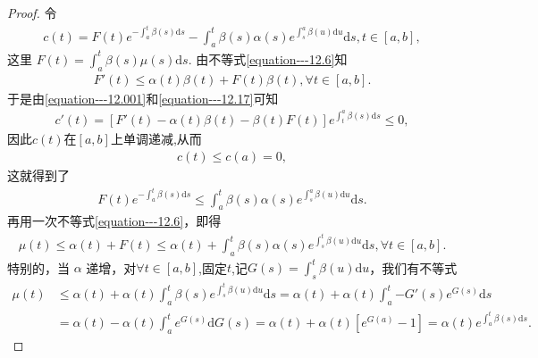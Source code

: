 \documentclass[../../main.tex]{subfiles}%
\begin{document}
\begin{proof}

令
\begin{align}
c(t)=F(t)e^{-\int_{a}^{t}\beta(s)\mathrm{d}s}-\int_{a}^{t}\beta(s)\alpha(s)e^{\int_{s}^{a}\beta(u)\mathrm{d}u}\mathrm{d}s,t\in[a,b],\label{equation---12.001}
\end{align}
这里 $F(t)=\int_{a}^{t}\beta(s)\mu(s)\mathrm{d}s$. 由不等式\eqref{equation---12.6}知
\begin{align}
F'(t)\leqslant\alpha(t)\beta(t)+F(t)\beta(t),\forall t\in[a,b].\label{equation---12.17}
\end{align}
于是由\eqref{equation---12.001}和\eqref{equation---12.17}可知
\begin{align*}
c'(t)=[F'(t)-\alpha(t)\beta(t)-\beta(t)F(t)]e^{\int_{t}^{a}\beta(s)\mathrm{d}s}\leqslant0,
\end{align*}
因此$c(t)$在$[a,b]$上单调递减,从而
\begin{align*}
c(t)\leqslant c(a)=0,
\end{align*}
这就得到了
\begin{align*}
F(t)e^{-\int_{a}^{t}\beta(s)\mathrm{d}s}\leqslant\int_{a}^{t}\beta(s)\alpha(s)e^{\int_{s}^{a}\beta(u)\mathrm{d}u}\mathrm{d}s.
\end{align*}
再用一次不等式\eqref{equation---12.6}，即得
\begin{align*}
\mu(t)\leqslant\alpha(t)+F(t)\leqslant\alpha(t)+\int_{a}^{t}\beta(s)\alpha(s)e^{\int_{s}^{t}\beta(u)\mathrm{d}u}\mathrm{d}s,\forall t\in[a,b].
\end{align*}
特别的，当 $\alpha$ 递增，对$\forall t\in [a,b]$,固定$t$,记$G(s)=\int_s^t{\beta (u)\mathrm{d}u}$，我们有不等式
\begin{align*}
\mu (t)&\leqslant \alpha (t)+\alpha (t)\int_a^t{\beta (s)e^{\int_s^t{\beta (u)\mathrm{d}u}}\mathrm{d}s}=\alpha (t)+\alpha (t)\int_a^t{-G' \left( s \right) e^{G\left( s \right)}\mathrm{d}s}
\\
&=\alpha (t)-\alpha (t)\int_a^t{e^{G\left( s \right)}\mathrm{d}G\left( s \right)}=\alpha (t)+\alpha (t)\left[ e^{G\left( a \right)}-1 \right] =\alpha (t)e^{\int_a^t{\beta (s)\mathrm{d}s}}.
\end{align*} 

\end{proof}
\end{document}
